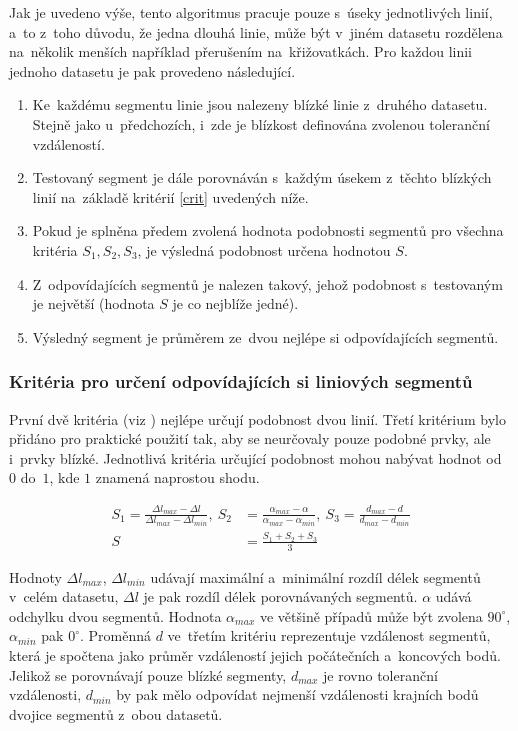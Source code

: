 Jak je uvedeno výše, tento algoritmus pracuje pouze s~úseky jednotlivých
linií, a~to z~toho důvodu, že jedna dlouhá linie, může být v~jiném datasetu
rozdělena na~několik menších například přerušením na~křižovatkách. Pro každou
linii jednoho datasetu je pak provedeno následující. 

\begin{enumerate}
 \item Ke~každému segmentu linie jsou nalezeny blízké linie z~druhého datasetu.
       Stejně jako u~předchozích, i~zde je blízkost definována zvolenou toleranční
       vzdáleností.
 \item Testovaný segment je dále porovnáván s~každým úsekem z~těchto blízkých
       linií na~základě kritérií \ref{crit} uvedených níže.
 \item Pokud je splněna předem zvolená hodnota podobnosti segmentů pro všechna 
       kritéria $S_1,S_2,S_3$, je výsledná podobnost určena hodnotou $S$.
 \item Z~odpovídajících segmentů je nalezen takový, jehož podobnost s~testovaným
       je největší (hodnota $S$ je co nejblíže jedné).
 \item Výsledný segment je průměrem ze~dvou nejlépe si odpovídajících segmentů.
\end{enumerate}

\subsubsection*{Kritéria pro určení odpovídajících si liniových segmentů}
První dvě kritéria (viz \cite{moosavi}) nejlépe určují podobnost dvou 
linií. Třetí kritérium bylo přidáno pro praktické použití tak, aby se neurčovaly
pouze podobné prvky, ale i~prvky blízké. Jednotlivá kritéria určující podobnost 
mohou nabývat hodnot od~$0$ do~$1$, kde $1$ znamená naprostou shodu.

\begin{equation}
 \begin{aligned}
 S_1 = \frac{ \Delta l_{max} - \Delta l }{ \Delta l_{max} - \Delta l_{min}},\ 
 S_2 &= \frac{ \alpha_{max} - \alpha }{ \alpha_{max} - \alpha_{min}},\ 
 S_3 = \frac{ d_{max} - d }{ d_{max} - d_{min}}\\
 S &= \frac{S_1+S_2+S_3}{3}
 \label{crit}
 \end{aligned}
\end{equation}

Hodnoty $\Delta l_{max}$, $\Delta l_{min}$ udávají maximální a~minimální rozdíl délek
segmentů v~celém datasetu, $\Delta l$ je pak rozdíl délek porovnávaných segmentů.
$\alpha$ udává odchylku dvou segmentů. Hodnota $\alpha_{max}$ ve většině případů může
být zvolena $90^{\circ}$, $\alpha_{min}$ pak $0^\circ$. Proměnná $d$ ve~třetím 
kritériu reprezentuje vzdálenost segmentů, která je spočtena jako průměr vzdáleností
jejich počátečních a~koncových bodů. Jelikož se porovnávají pouze blízké segmenty,
$d_{max}$ je rovno toleranční vzdálenosti, $d_{min}$ by pak mělo odpovídat nejmenší
vzdálenosti krajních bodů dvojice segmentů z~obou datasetů.


